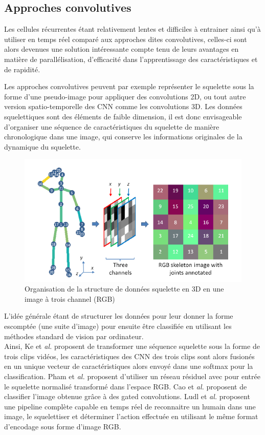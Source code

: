  

\subsection{Approches convolutives}
Les cellules récurrentes étant relativement lentes et difficiles à entrainer ainsi qu'à utiliser en temps réel comparé aux approches dites convolutives, celles-ci sont alors devenues une solution intéressante compte tenu de leurs avantages en matière de parallélisation, d'efficacité dans l'apprentissage des caractéristiques et de rapidité.


Les approches convolutives peuvent par exemple représenter le squelette sous la forme d'une pseudo-image pour appliquer des convolutions 2D, ou tout autre version spatio-temporelle des CNN comme les convolutions 3D. Les données squelettiques sont des éléments de faible dimension, il est donc envisageable d'organiser une séquence de caractéristiques du squelette de manière chronologique dans une image, qui conserve les informations originales de la dynamique du squelette.

\begin{figure}[H]
    \centering
    \includegraphics[width=0.7\linewidth]{Images/skeltoim.png}
    \caption{Organisation de la structure de données squelette en 3D en une image à trois channel (RGB)}
    \label{fig:skeltoim}
\end{figure}
L’idée générale étant de structurer les données pour leur donner la forme escomptée (une suite d’image) pour ensuite être classifiée en utilisant les méthodes standard de vision par ordinateur.\\


Ainsi, Ke et\textit{ al.} \cite{ke2017new} proposent de transformer une séquence squelette sous la forme de trois clips vidéos, les caractéristiques des CNN des trois clips sont alors fusionés en un unique vecteur de caractéristiques alors envoyé dans une softmax pour la classification.
Pham et\textit{ al.} \cite{pham2018learning} proposent d'utiliser un réseau résiduel \cite{he2016deep} avec pour entrée le squelette normalisé transformé dans l'espace RGB.
Cao et\textit{ al.}\cite{cao2018skeleton} proposent de classifier l'image obtenue grâce à des gated convolutions.
Ludl et\textit{ al.} \cite{ludl2019simple} proposent une pipeline complète capable en temps réel de reconnaitre un humain dans une image, le squelettiser et déterminer l'action effectuée en utilisant le même format d'encodage sous forme d'image RGB.\\

